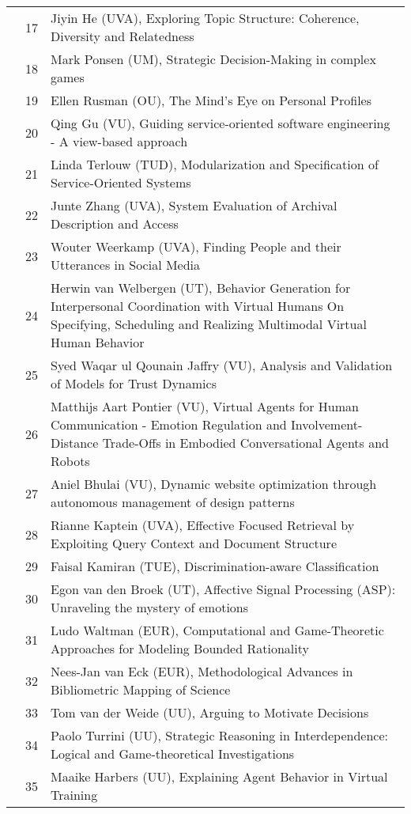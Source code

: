 \begin{longtabu}{@{}l@{ }l@{\hspace{1em}}X}
	&	 17	&	 Jiyin He (UVA), Exploring Topic Structure: Coherence, Diversity and Relatedness\\
	&	 18	&	 Mark Ponsen (UM), Strategic Decision-Making in complex games\\
	&	 19	&	 Ellen Rusman (OU), The Mind's Eye on Personal Profiles\\
	&	 20	&	 Qing Gu (VU), Guiding service-oriented software engineering - A view-based approach\\
	&	 21	&	 Linda Terlouw (TUD), Modularization and Specification of Service-Oriented Systems\\
	&	 22	&	 Junte Zhang (UVA), System Evaluation of Archival Description and Access\\
	&	 23	&	 Wouter Weerkamp (UVA), Finding People and their Utterances in Social Media\\
	&	 24	&	 Herwin van Welbergen (UT), Behavior Generation for Interpersonal Coordination with Virtual Humans On Specifying, Scheduling and Realizing Multimodal Virtual Human Behavior\\
	&	 25	&	 Syed Waqar ul Qounain Jaffry (VU), Analysis and Validation of Models for Trust Dynamics\\
	&	 26	&	 Matthijs Aart Pontier (VU), Virtual Agents for Human Communication - Emotion Regulation and Involvement-Distance Trade-Offs in Embodied Conversational Agents and Robots\\
	&	 27	&	 Aniel Bhulai (VU), Dynamic website optimization through autonomous management of design patterns\\
	&	 28	&	 Rianne Kaptein (UVA), Effective Focused Retrieval by Exploiting Query Context and Document Structure\\
	&	 29	&	 Faisal Kamiran (TUE), Discrimination-aware Classification\\
	&	 30	&	 Egon van den Broek (UT), Affective Signal Processing (ASP): Unraveling the mystery of emotions\\
	&	 31	&	 Ludo Waltman (EUR), Computational and Game-Theoretic Approaches for Modeling Bounded Rationality\\
	&	 32	&	 Nees-Jan van Eck (EUR), Methodological Advances in Bibliometric Mapping of Science\\
	&	 33	&	 Tom van der Weide (UU), Arguing to Motivate Decisions\\
	&	 34	&	 Paolo Turrini (UU), Strategic Reasoning in Interdependence: Logical and Game-theoretical Investigations\\
	&	 35	&	 Maaike Harbers (UU), Explaining Agent Behavior in Virtual Training\\

\end{longtabu}
